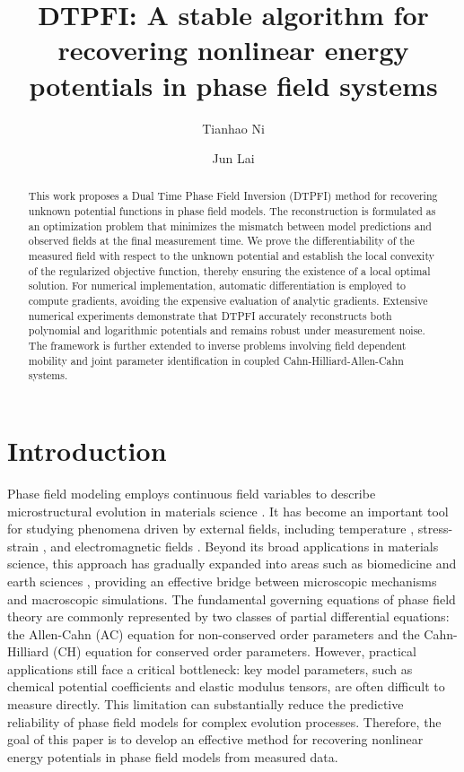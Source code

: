 \documentclass[11pt,reqno]{amsart}
\title{DTPFI: A stable algorithm for recovering nonlinear energy potentials in phase field systems}
\author{Tianhao Ni}
\author{Jun Lai}
\begin{document}
	\begin{abstract}
This work proposes a Dual Time Phase Field Inversion (DTPFI) method for recovering unknown potential functions in phase field models. The reconstruction is formulated as an optimization problem that minimizes the mismatch between model predictions and observed fields at the final measurement time. 
We prove the differentiability of the measured field with respect to the unknown potential and establish the local convexity of the regularized objective function, thereby ensuring the existence of a local optimal solution. 
For numerical implementation, automatic differentiation is employed to compute gradients, avoiding the expensive  evaluation of analytic gradients.
Extensive numerical experiments demonstrate that DTPFI accurately reconstructs both polynomial and logarithmic potentials and remains robust under measurement noise.
The framework is further extended to inverse problems involving field dependent mobility and joint parameter identification in coupled Cahn-Hilliard-Allen-Cahn systems.
\end{abstract}
	\maketitle

\section{Introduction}
Phase field modeling employs continuous field variables to describe microstructural evolution in materials science \cite{wang1995microstructural,rubin1999three,khachaturyan2013theory}. It has become an important tool for studying phenomena driven by external fields, including temperature \cite{liu2012micro}, stress-strain \cite{hu2007phase}, and electromagnetic fields \cite{sun2023phase}. Beyond its broad applications in materials science, this approach has gradually expanded into areas such as biomedicine \cite{lima2014hybrid,travasso2011phase} and earth sciences \cite{wendler2009phase,mikelic2015phase}, providing an effective bridge between microscopic mechanisms and macroscopic simulations. The fundamental governing equations of phase field theory are commonly represented by two classes of partial differential equations: the Allen-Cahn (AC) equation \cite{allen1979microscopic} for non-conserved order parameters and the Cahn-Hilliard (CH) equation \cite{cahn1958free} for conserved order parameters. However, practical applications still face a critical bottleneck: key model parameters, such as chemical potential coefficients and elastic modulus tensors, are often difficult to measure directly. This limitation can substantially reduce the predictive reliability of phase field models for complex evolution processes. Therefore, the goal of this paper is to develop an effective method for recovering nonlinear energy potentials in phase field models from measured data.
\end{document}

